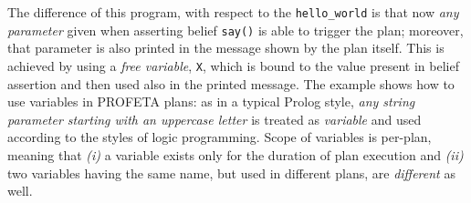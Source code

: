 The difference of this program, with respect to the \texttt{hello\_world}
is that now \emph{any parameter} given when asserting belief \texttt{say()}
is able to trigger the plan; moreover, that parameter is also printed in the
message shown by the plan itself.
This is achieved by using a \emph{free variable}, \texttt{X}, which is
bound to the value present in belief assertion and then used also in the
printed message.
The example shows how to use variables in PROFETA plans: as in a typical
Prolog style, \emph{any string parameter starting with an uppercase letter}
is treated as \emph{variable} and used according to the styles of logic
programming.
Scope of variables is per-plan, meaning that \emph{(i)} a variable exists
only for the
duration of plan execution and  \emph{(ii)}  two variables having the same
name, but used in different plans, are \emph{different} as well.
